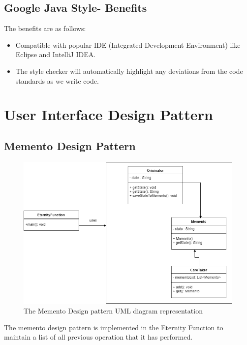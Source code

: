 \documentclass[11pt, english]{report}
\begin{document}
\subsection{Google Java Style- Benefits}

The benefits are as follows:

\begin{itemize}
    \item Compatible with popular IDE (Integrated Development Environment) like Eclipse and IntelliJ IDEA.
    \item The style checker will automatically highlight any deviations from the code standards as we write code.
\end{itemize} 

\section{User Interface Design Pattern}

\subsection{Memento Design Pattern}

\begin{figure}[H]
  
  \includegraphics[width=1\textwidth]{memento.png}
  \centering
  \caption{The Memento Design pattern UML diagram representation
}
\end{figure}

The memento design pattern\cite{memento} is implemented in the Eternity Function to maintain a list of all previous operation that it has performed.\\
\end{document}
